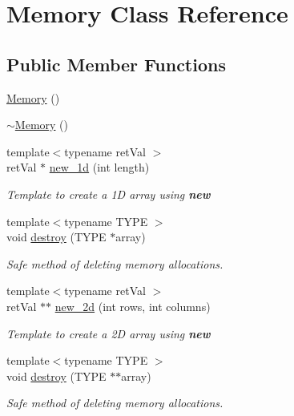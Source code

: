 \hypertarget{class_memory}{}\section{Memory Class Reference}
\label{class_memory}
\subsection*{Public Member Functions}
\begin{DoxyCompactItemize}
\item 
\hyperlink{class_memory_a585d7bb6fc6f2237bcebf94a86b7dd99}{Memory} ()
\item 
\hyperlink{class_memory_a0ffa9759ebbf103f11132a505b93bdc0}{$\sim$\+Memory} ()
\item 
{\footnotesize template$<$typename ret\+Val $>$ }\\ret\+Val $\ast$ \hyperlink{class_memory_ac85016fc5b35830f5ba8755fcb763af5}{new\+\_\+1d} (int length)
\begin{DoxyCompactList}\small\item\em Template to create a 1\+D array using {\bfseries {\ttfamily new}} \end{DoxyCompactList}\item 
{\footnotesize template$<$typename T\+Y\+P\+E $>$ }\\void \hyperlink{class_memory_a35edb59e9a629c1239d01652edbf8f1f}{destroy} (T\+Y\+P\+E $\ast$array)
\begin{DoxyCompactList}\small\item\em Safe method of deleting memory allocations. \end{DoxyCompactList}\item 
{\footnotesize template$<$typename ret\+Val $>$ }\\ret\+Val $\ast$$\ast$ \hyperlink{class_memory_a6510b926e48e95476486b68ebbc919e8}{new\+\_\+2d} (int rows, int columns)
\begin{DoxyCompactList}\small\item\em Template to create a 2\+D array using {\bfseries {\ttfamily new}} \end{DoxyCompactList}\item 
{\footnotesize template$<$typename T\+Y\+P\+E $>$ }\\void \hyperlink{class_memory_a9157a913582b2096e4dbd656175766b2}{destroy} (T\+Y\+P\+E $\ast$$\ast$array)
\begin{DoxyCompactList}\small\item\em Safe method of deleting memory allocations. \end{DoxyCompactList}\end{DoxyCompactItemize}


